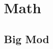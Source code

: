 %                 
%                 
%                 
%                 
%                 

%                 
%                 

\section{Math}
        \subsection{Big Mod}
                
%                 
%                 
